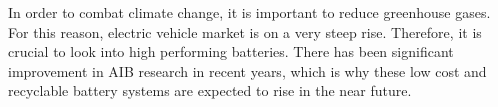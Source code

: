 In order to combat climate change, it is important to reduce greenhouse gases. For this reason, electric vehicle market is on a very steep rise. Therefore, it is crucial to look into high performing batteries. There has been significant improvement in AIB research in
recent years, which is why these low cost and recyclable battery systems are expected to rise in the near future.